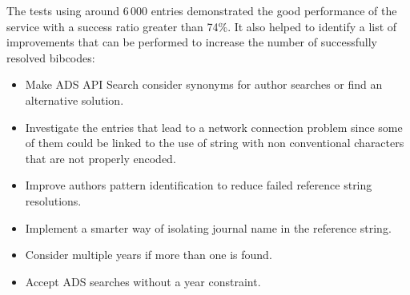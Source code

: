 \documentclass[a4paper,10pt,twoside]{article}
\begin{document}
The tests using around 6\,000 entries demonstrated the good performance of the service with a success ratio greater than 74\%. It also helped to identify a list of improvements that can be performed to increase the number of successfully resolved bibcodes:

\begin{itemize}
	\item Make ADS API Search consider synonyms for author searches or find an alternative solution.
	\item Investigate the entries that lead to a network connection problem since some of them could be linked to the use of string with non conventional characters that are not properly encoded.
	\item Improve authors pattern identification to reduce failed reference string resolutions.
	\item Implement a smarter way of isolating journal name in the reference string.
	\item Consider multiple years if more than one is found.
	\item Accept ADS searches without a year constraint.
\end{itemize}





\end{document}
